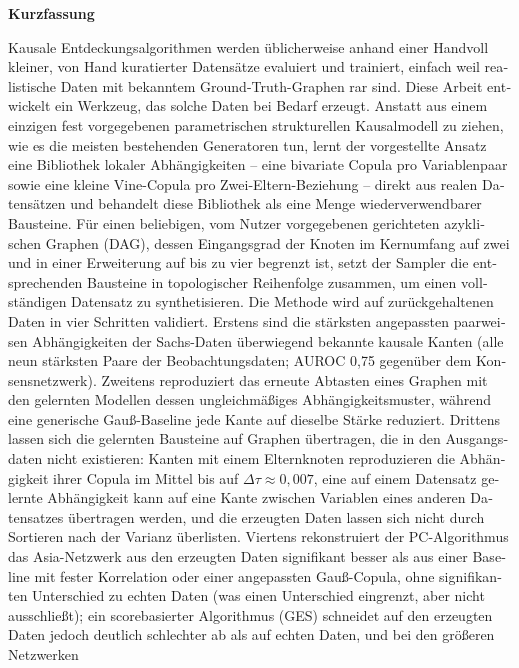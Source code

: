 \documentclass[
  english,
  class=report,
  accentcolor=2c,
  marginpar=false,
  parskip=half-,
  fontsize=11pt,
  ruledheaders=false,
  pdfa=false,
  IMRAD=false,
  thesis={type=master}
]{tudapub}
\newenvironment{centeredabstract}[1][Abstract]{%
  \clearpage
  \thispagestyle{empty}
  \begin{center}
    {\Large \bfseries #1}\\[1em]
    \begin{minipage}{0.8\textwidth}
      \normalsize
}{%
    \end{minipage}
  \end{center}
  \clearpage
}
\begin{document}
\begin{centeredabstract}[Kurzfassung]
\begin{otherlanguage}{german}
Kausale Entdeckungsalgorithmen werden üblicherweise anhand einer Handvoll
kleiner, von Hand kuratierter Datensätze evaluiert und trainiert, einfach
weil realistische Daten mit bekanntem Ground-Truth-Graphen rar sind. Diese
Arbeit entwickelt ein Werkzeug, das solche Daten bei Bedarf erzeugt.
Anstatt aus einem einzigen fest vorgegebenen parametrischen strukturellen
Kausalmodell zu ziehen, wie es die meisten bestehenden Generatoren tun,
lernt der vorgestellte Ansatz eine Bibliothek lokaler Abhängigkeiten --
eine bivariate Copula pro Variablenpaar sowie eine kleine Vine-Copula pro
Zwei-Eltern-Beziehung -- direkt aus realen Datensätzen und behandelt diese
Bibliothek als eine Menge wiederverwendbarer Bausteine. Für einen
beliebigen, vom Nutzer vorgegebenen gerichteten azyklischen Graphen (DAG),
dessen Eingangsgrad der Knoten im Kernumfang auf zwei und in einer Erweiterung auf
bis zu vier begrenzt ist, setzt der Sampler die entsprechenden Bausteine in
topologischer Reihenfolge zusammen, um einen vollständigen Datensatz zu
synthetisieren. Die Methode wird auf zur\"uckgehaltenen Daten in vier Schritten
validiert. Erstens sind die st\"arksten angepassten paarweisen
Abh\"angigkeiten der Sachs-Daten \"uberwiegend bekannte kausale Kanten (alle
neun st\"arksten Paare der Beobachtungsdaten; AUROC 0{,}75 gegen\"uber dem
Konsensnetzwerk). Zweitens reproduziert das erneute Abtasten eines Graphen
mit den gelernten Modellen dessen ungleichm\"a{\ss}iges Abh\"angigkeitsmuster,
w\"ahrend eine generische Gau{\ss}-Baseline jede Kante auf dieselbe St\"arke
reduziert. Drittens lassen sich die gelernten Bausteine auf Graphen
\"ubertragen, die in den Ausgangsdaten nicht existieren: Kanten mit einem
Elternknoten reproduzieren die Abh\"angigkeit ihrer Copula im Mittel bis auf
$\Delta\tau \approx 0{,}007$, eine auf einem Datensatz gelernte Abh\"angigkeit
kann auf eine Kante zwischen Variablen eines anderen Datensatzes
\"ubertragen werden, und die erzeugten Daten lassen sich nicht durch
Sortieren nach der Varianz \"uberlisten. Viertens rekonstruiert der
PC-Algorithmus das Asia-Netzwerk aus den erzeugten Daten signifikant besser
als aus einer Baseline mit fester Korrelation oder einer angepassten
Gau{\ss}-Copula, ohne signifikanten Unterschied zu echten Daten (was einen
Unterschied eingrenzt, aber nicht ausschlie{\ss}t); ein scorebasierter
Algorithmus (GES) schneidet auf den erzeugten Daten jedoch deutlich
schlechter ab als auf echten Daten, und bei den gr\"o{\ss}eren Netzwerken

\end{otherlanguage}
\end{centeredabstract}
\end{document}

